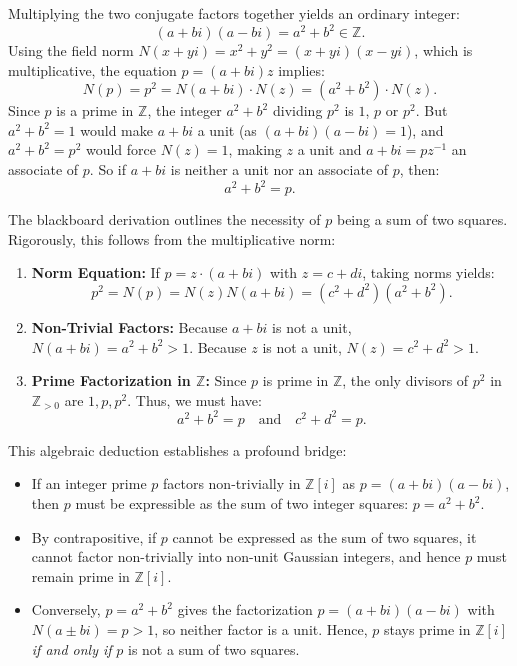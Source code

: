 \begin{content}
Multiplying the two conjugate factors together yields an ordinary integer:
\[
(a + bi)(a - bi) = a^2 + b^2 \in \mathbb{Z}.
\]
Using the field norm $N(x + yi) = x^2 + y^2 = (x + yi)(x - yi)$, which is multiplicative, the equation $p = (a + bi)z$ implies:
\[
N(p) = p^2 = N(a + bi) \cdot N(z) = (a^2 + b^2) \cdot N(z).
\]
Since $p$ is a prime in $\mathbb{Z}$, the integer $a^2 + b^2$ dividing $p^2$ is $1$, $p$ or $p^2$. But $a^2 + b^2 = 1$ would make $a + bi$ a unit (as $(a + bi)(a - bi) = 1$), and $a^2 + b^2 = p^2$ would force $N(z) = 1$, making $z$ a unit and $a + bi = p z^{-1}$ an associate of $p$. So if $a + bi$ is neither a unit nor an associate of $p$, then:
\begin{equation}\label{eq:sum-of-squares-condition}
a^2 + b^2 = p.
\end{equation}

\begin{steps}
The blackboard derivation outlines the necessity of $p$ being a sum of two squares. Rigorously, this follows from the multiplicative norm:
\begin{enumerate}[label=\textbf{(\arabic*)}]
    \item \textbf{Norm Equation:} If $p = z \cdot (a + bi)$ with $z = c + di$, taking norms yields:
    \[
    p^2 = N(p) = N(z) N(a + bi) = (c^2 + d^2)(a^2 + b^2).
    \]
    \item \textbf{Non-Trivial Factors:} Because $a + bi$ is not a unit, $N(a + bi) = a^2 + b^2 > 1$. Because $z$ is not a unit, $N(z) = c^2 + d^2 > 1$.
    \item \textbf{Prime Factorization in $\mathbb{Z}$:} Since $p$ is prime in $\mathbb{Z}$, the only divisors of $p^2$ in $\mathbb{Z}_{>0}$ are $1, p, p^2$. Thus, we must have:
    \[
    a^2 + b^2 = p \quad \text{and} \quad c^2 + d^2 = p.
    \]
\end{enumerate}
\end{steps}

\begin{steps}
This algebraic deduction establishes a profound bridge:
\begin{itemize}
    \item If an integer prime $p$ factors non-trivially in $\mathbb{Z}[i]$ as $p = (a + bi)(a - bi)$, then $p$ must be expressible as the sum of two integer squares: $p = a^2 + b^2$.
    \item By contrapositive, if $p$ cannot be expressed as the sum of two squares, it cannot factor non-trivially into non-unit Gaussian integers, and hence $p$ must remain prime in $\mathbb{Z}[i]$.
    \item Conversely, $p = a^2 + b^2$ gives the factorization $p = (a + bi)(a - bi)$ with $N(a \pm bi) = p > 1$, so neither factor is a unit. Hence, $p$ stays prime in $\mathbb{Z}[i]$ \emph{if and only if} $p$ is not a sum of two squares.
\end{itemize}
\end{steps}
\end{content}

